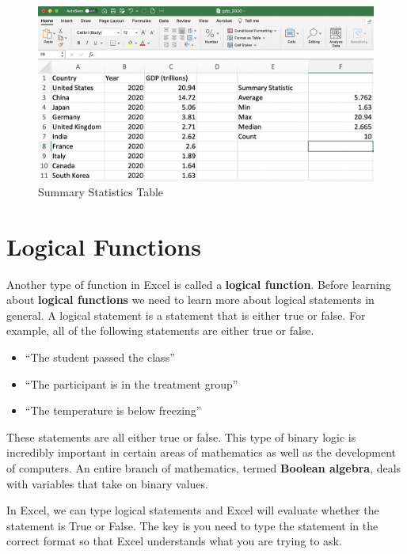 \documentclass[
]{book}
\begin{document}
\begin{figure}

{\centering \includegraphics[width=0.8\linewidth]{images/01_gdp_sum_stats} 

}

\caption{Summary Statistics Table}\label{fig:gdpsumstats}
\end{figure}

\hypertarget{logical-functions}{%
\section{Logical Functions}\label{logical-functions}}

Another type of function in Excel is called a \textbf{logical function}. Before learning about \textbf{logical functions} we need to learn more about logical statements in general. A logical statement is a statement that is either true or false. For example, all of the following statements are either true or false.

\begin{itemize}
\item
  ``The student passed the class''
\item
  ``The participant is in the treatment group''
\item
  ``The temperature is below freezing''
\end{itemize}

These statements are all either true or false. This type of binary logic is incredibly important in certain areas of mathematics as well as the development of computers. An entire branch of mathematics, termed \textbf{Boolean algebra}, deals with variables that take on binary values.

In Excel, we can type logical statements and Excel will evaluate whether the statement is True or False. The key is you need to type the statement in the correct format so that Excel understands what you are trying to ask.
\end{document}
